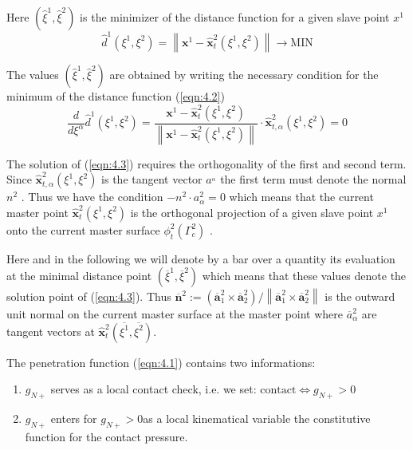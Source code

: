 Here $(\hat{\xi}^1,\hat{\xi}^2)$ is the minimizer of the distance function for a given slave point $x^1$
\begin{equation}
 \hat{d}^{1}\left(\xi^{1}, \xi^{2}\right)=\left\|\mathbf{x}^{1}-\hat{\mathbf{x}}_{t}^{2}\left(\xi^{1}, \xi^{2}\right)\right\| \longrightarrow \mathrm{MIN} 
 \label{eqn:4.2} 
\end{equation}

The values  $(\hat{\xi}^1,\hat{\xi}^2)$ are obtained by writing the necessary condition for the minimum of
the distance function (\ref{eqn:4.2})
\begin{equation}
 \frac{d}{d \xi^{\alpha}} \hat{d}^{1}\left(\xi^{1}, \xi^{2}\right)=\frac{\mathbf{x}^{1}-\hat{\mathbf{x}}_{t}^{2}\left(\xi^{1}, \xi^{2}\right)}{\left\|\mathbf{x}^{1}-\hat{\mathbf{x}}_{t}^{2}\left(\xi^{1}, \xi^{2}\right)\right\|} \cdot \hat{\mathbf{x}}_{t, \alpha}^{2}\left(\xi^{1}, \xi^{2}\right)=0
 \label{eqn:4.3} 
\end{equation}

The solution of (\ref{eqn:4.3}) requires the orthogonality of the ﬁrst and second term. Since
$ \hat{\mathbf{x}}_{t, \alpha}^{2}\left(\xi^{1}, \xi^{2}\right) 
$  is the tangent vector $a^_\alpha$ the ﬁrst term must denote the normal $n^2$ . Thus we
have the condition $-n^2 \cdot a^2_\alpha=0$ which means that the current master point $ \hat{\mathbf{x}}_{t}^{2}\left(\xi^{1}, \xi^{2}\right) 
$ is
the orthogonal projection of a given slave point $x^1$ onto the current master surface $\phi_t^2(\Gamma^2_c)$ .

Here and in the following we will denote by a bar over a quantity its evaluation at the
minimal distance point $\left(\overline{\xi}^{1}, \overline{\xi}^{2}\right)$ which means that these values denote the solution point of
(\ref{eqn:4.3}). Thus $\overline{\mathbf{n}}^{2}:=\left(\overline{\mathbf{a}}_{1}^{2} \times \overline{\mathbf{a}}_{2}^{2}\right) /\left\|\overline{\mathbf{a}}_{1}^{2} \times \overline{\mathbf{a}}_{2}^{2}\right\|$ is the outward unit normal on the current master
surface at the master point where $\overline{a}_\alpha^2$ are tangent vectors at $\hat{\mathbf{x}}_{t}^{2}\left(\overline{\xi^{1}}, \overline{\xi^{2}}\right)$.

The penetration function (\ref{eqn:4.1}) contains two informations:
\begin{enumerate}
    \item $g_{N+} $ serves as a local contact check, i.e. we set: $\text{contact} \Leftrightarrow	 g_{ N + }> 0$
    \item  $g_{N+} $ enters for $g_{N+} > 0$as a local kinematical variable the constitutive function for the contact pressure.
\end{enumerate}

